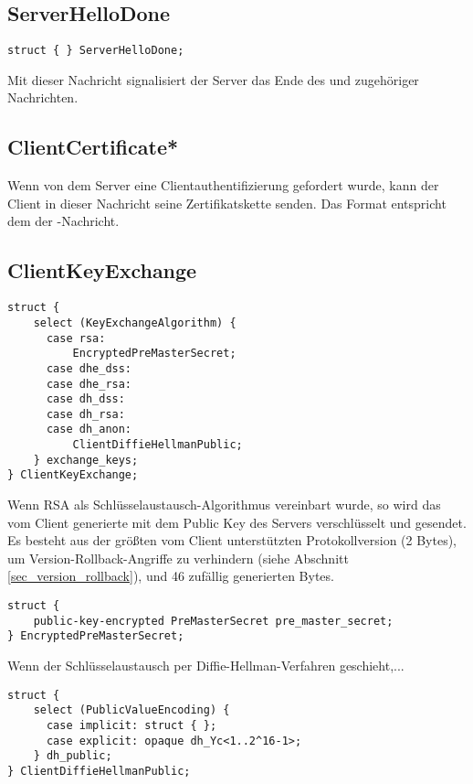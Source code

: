 \subsection*{ServerHelloDone}

\begin{lstlisting}
struct { } ServerHelloDone;
\end{lstlisting}

Mit dieser Nachricht signalisiert der Server das Ende des \serverhello{} und zugehöriger Nachrichten.

\subsection*{ClientCertificate*}

Wenn von dem Server eine Clientauthentifizierung gefordert wurde, kann der Client in dieser Nachricht seine Zertifikatskette senden. Das Format entspricht dem der \servercertificate{}-Nachricht.

\subsection*{ClientKeyExchange}

\begin{lstlisting}
struct {
	select (KeyExchangeAlgorithm) {
	  case rsa:
	      EncryptedPreMasterSecret;
	  case dhe_dss:
	  case dhe_rsa:
	  case dh_dss:
	  case dh_rsa:
	  case dh_anon:
	      ClientDiffieHellmanPublic;
	} exchange_keys;
} ClientKeyExchange;
\end{lstlisting}

Wenn RSA als Schlüsselaustausch-Algorithmus vereinbart wurde, so wird das vom Client generierte \premastersecret{} mit dem Public Key des Servers verschlüsselt und gesendet. Es besteht aus der größten vom Client unterstützten Protokollversion (2 Bytes), um Version-Rollback-Angriffe zu verhindern (siehe Abschnitt \ref{sec_version_rollback}), und 46 zufällig generierten Bytes.

\begin{lstlisting}
struct {
	public-key-encrypted PreMasterSecret pre_master_secret;
} EncryptedPreMasterSecret;
\end{lstlisting}

Wenn der Schlüsselaustausch per Diffie-Hellman-Verfahren geschieht,...

\begin{lstlisting}
struct {
	select (PublicValueEncoding) {
	  case implicit: struct { };
	  case explicit: opaque dh_Yc<1..2^16-1>;
	} dh_public;
} ClientDiffieHellmanPublic;
\end{lstlisting}

